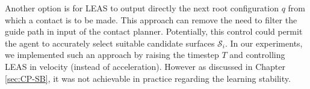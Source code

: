 Another option is for LEAS to output directly the next root configuration $q$ from which a contact is to be made.
This approach can remove the need to filter the guide path in input of the contact planner.
Potentially, this control could permit the agent to accurately select suitable candidate surfaces $\mathcal{S}_i$.
In our experiments, we implemented such an approach by raising the timestep $T$ and controlling LEAS in velocity (instead of acceleration). However as discussed in Chapter \ref{sec:CP-SB}, it was not achievable in practice regarding the learning stability.

